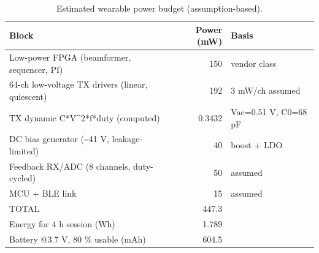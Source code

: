 \begin{table}
\caption{Estimated wearable power budget (assumption-based).}
\label{tab:T_S12_power_budget}
\begin{tabular}{lrl}
\toprule
Block & Power (mW) & Basis \\
\midrule
Low-power FPGA (beamformer, sequencer, PI) & 150 & vendor class \\
64-ch low-voltage TX drivers (linear, quiescent) & 192 & 3 mW/ch assumed \\
TX dynamic C*V\textasciicircum 2*f*duty (computed) & 0.3432 & Vac=0.51 V, C0=68 pF \\
DC bias generator (\textasciitilde 41 V, leakage-limited) & 40 & boost + LDO \\
Feedback RX/ADC (8 channels, duty-cycled) & 50 & assumed \\
MCU + BLE link & 15 & assumed \\
TOTAL & 447.3 &  \\
Energy for 4 h session (Wh) & 1.789 &  \\
Battery @3.7 V, 80 \% usable (mAh) & 604.5 &  \\
\bottomrule
\end{tabular}
\end{table}
